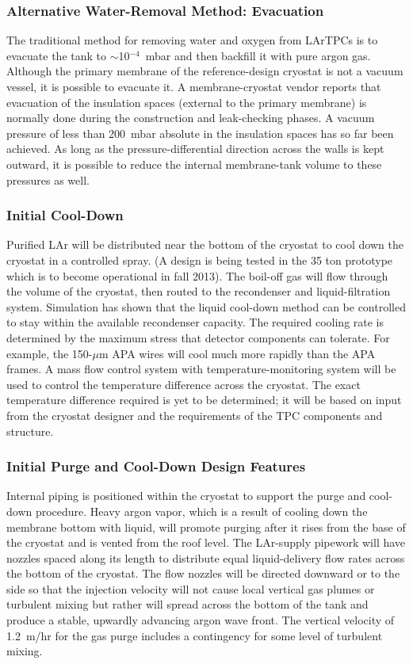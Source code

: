 \subsubsection{Alternative Water-Removal Method: Evacuation}

The traditional method for removing water and oxygen from LArTPCs is to evacuate the tank to $\sim$10$^{-4}$~mbar  and then backfill it with pure argon gas. Although the primary membrane of the reference-design cryostat is not a vacuum vessel, it is possible to evacuate it.  A membrane-cryostat vendor reports that evacuation of  the insulation spaces (external to the primary membrane) is normally done during the construction and leak-checking phases.  A vacuum pressure of less than 200~mbar absolute in the insulation spaces has so far been achieved.  As long as the pressure-differential direction across the walls is kept outward, it is possible to reduce the internal membrane-tank volume to these pressures as well.  

\subsubsection{Initial Cool-Down}

Purified LAr will be distributed near
the bottom of the cryostat to cool down the cryostat in a controlled spray.
(A design is being tested in the 35 ton prototype which is to become
operational in fall 2013). The boil-off gas will flow through the volume of the cryostat, then
routed to the recondenser and liquid-filtration system. Simulation
has shown that the liquid cool-down method can
be controlled to stay within the available recondenser capacity. The required cooling rate
is determined by the maximum stress that detector components can
tolerate. For example, the 150-$\mu$m APA wires will cool much more rapidly than the APA frames.
A mass flow control system with temperature-monitoring system will be used to control the
temperature difference across the cryostat. The exact temperature difference required is yet to
be determined; it will be based on input from the cryostat designer and the requirements of
the TPC components and structure.

\subsubsection{Initial Purge and Cool-Down Design Features}

Internal piping is positioned within the cryostat to support the purge and cool-down procedure.  Heavy argon vapor, which is a result of cooling down the membrane bottom with liquid, will promote purging after it rises from the base of the cryostat and is vented from the roof level.  The LAr-supply pipework will have nozzles spaced along its length to 
 distribute equal liquid-delivery flow rates across the bottom of the cryostat.  The flow nozzles will be directed downward or to the side so that the injection velocity will not cause local vertical gas plumes or turbulent mixing but rather will spread across the bottom of the tank and produce a stable, upwardly advancing argon wave front. The vertical velocity of 1.2~m/hr for the gas purge includes a contingency for some level of turbulent mixing. 

